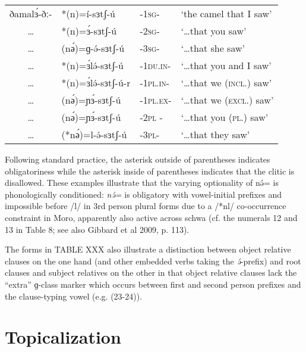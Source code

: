 \ea
\begin{tabular}[t]{clll}
	ðamalɜ́-ðː-  &    *(n)=í-sɜtʃ-ú	&-1\textsc{sg}-		&‘the camel that I saw’\\
 		    …	&     *(n)=ɜ́-sɜtʃ-ú	&-2\textsc{sg}-		&‘…that you saw’\\
		    …	&  (nә́)=ɡ-ə́-sɜtʃ-ú	&-3\textsc{sg}-		&‘…that she saw’\\
 		    …	&  *(n)=ɜ́lə́-sɜtʃ-ú	&-1\textsc{du.in}-	&‘…that you and I saw’\\	
		    …	&  *(n)=ɜ́lə́-sɜtʃ-ú-r	&-1\textsc{pl.in}-	&‘…that we (\textsc{incl}.) saw’\\
		    …	&   (nә́)=ɲɜ́-sɜtʃ-ú	&-1\textsc{pl.ex}- 	&‘…that we (\textsc{excl}.) saw’\\
		    …	&   (nә́)=ɲɜ́-sɜtʃ-ú	&-2\textsc{pl} - 		&‘…that you (\textsc{pl}.) saw’\\
		    …	& (*nә́)=l-ə́-sɜtʃ-ú 	&-3\textsc{pl}-		&‘…that they saw’\\
\end{tabular}
\z
Following standard practice, the asterisk outside of parentheses indicates obligatoriness while the asterisk inside of parentheses indicates that the clitic is disallowed. These examples illustrate that the varying optionality of nə́= is phonologically conditioned: \textit{nə́=} is obligatory with vowel-initial prefixes and impossible before /l/ in 3rd person plural forms due to a /*nl/ co-occurrence constraint in Moro, apparently also active across schwa (cf. the numerals 12 and 13 in Table 8; see also Gibbard et al 2009, p. 113).

The forms in TABLE XXX also illustrate a distinction between object relative clauses on the one hand (and other embedded verbs taking the \textit{ə́}-prefix) and root clauses and subject relatives on the other in that object relative clauses lack the “extra” ɡ-class marker which occurs between first and second person prefixes and the clause-typing vowel (e.g. (23-24)).

\section{Topicalization}